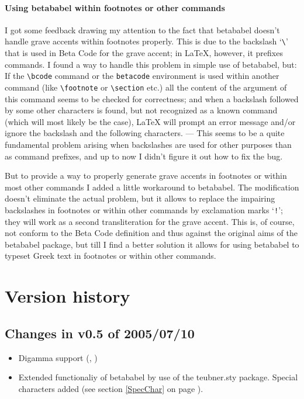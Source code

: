 \documentclass{article}
\begin{document}
\paragraph{Using \textsf{betababel} within footnotes or other commands}
\label{footbug}
I got some feedback drawing my attention to the fact that \textsf{betababel} doesn't handle grave accents within footnotes properly. This is due to the backslash `\verb=\=' that is used in Beta Code for the grave accent; in \LaTeX, however, it prefixes commands. I found a way to handle this problem in simple use of \textsf{betababel}, but: If the \verb=\bcode= command or the \texttt{betacode} environment is used within another command (like \verb=\footnote= or \verb=\section= etc.) all the content of the argument of this command seems to be checked for correctness; and when a backslash followed by some other characters is found, but not recognized as a known command (which will most likely be the case), \LaTeX{} will prompt an error message and/or ignore the backslash and the following characters. --- This seems to be a quite fundamental problem arising when backslashes are used for other purposes than as command prefixes, and up to now I didn't figure it out how to fix the bug.

But to provide a way to properly generate grave accents in footnotes or within most other commands I added a little workaround to \textsf{betababel}. The modification doesn't eliminate the actual problem, but it allows to replace the impairing backslashes in footnotes or within other commands by exclamation marks `\texttt{!}'; they will work as a second transliteration for the grave accent. This is, of course, not conform to the Beta Code definition and thus against the original aims of the \textsf{betababel} package, but till I find a better solution it allows for using \textsf{betababel} to typeset Greek text in footnotes or within other commands.

\section{Version history}
\subsection{Changes in v0.5 of 2005/07/10}
\begin{itemize}
\item Digamma support (, )
\item Extended functionaliy of \textsf{betababel} by use of the \textsf{teubner.sty} package. Special characters added (see section \ref{SpecChar} on page \pageref{SpecChar}).
\end{itemize}
\end{document}
